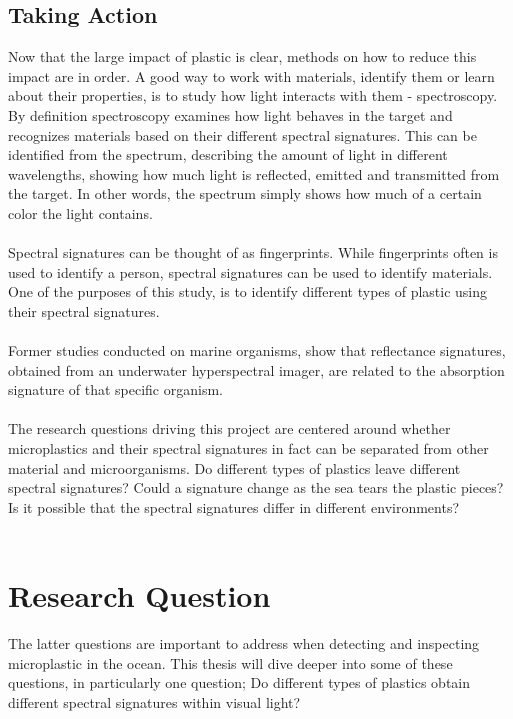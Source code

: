 \subsection{Taking Action}
Now that the large impact of plastic is clear, methods on how to reduce this impact are in order. A good way to work with materials, identify them or learn about their properties, is to study how light interacts with them - spectroscopy. By definition spectroscopy examines how light behaves in the target and recognizes materials based on their different spectral signatures. This can be identified from the spectrum, describing the amount of light in different wavelengths, showing how much light is reflected, emitted and transmitted from the target. In other words, the spectrum simply shows how much of a certain color the light contains. 
\\\\
Spectral signatures can be thought of as fingerprints. While fingerprints often is used to identify a person, spectral signatures can be used to identify materials. One of the purposes of this study, is to identify different types of plastic using their spectral signatures. %
\\\\
Former studies conducted on marine organisms, show that reflectance signatures, obtained from an underwater hyperspectral imager, are related to the absorption signature of that specific organism. %
\\\\
The research questions driving this project are centered around whether microplastics and their spectral signatures in fact can be separated from other material and microorganisms. Do different types of plastics leave different spectral signatures? Could a signature change as the sea tears the plastic pieces? Is it possible that the spectral signatures differ in different environments?
\\\\
\section{Research Question}
The latter questions are important to address when detecting and inspecting microplastic in the ocean. This thesis will dive deeper into some of these questions, in particularly one question; Do different types of plastics obtain different spectral signatures within visual light?
\\\\
